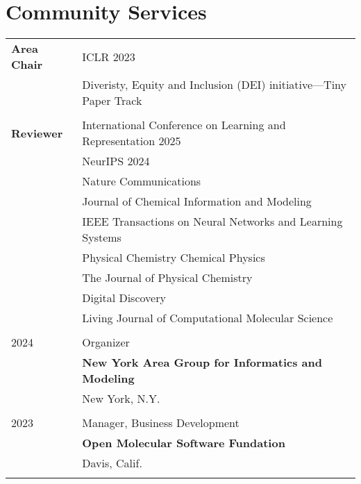\section{Community Services}
\begin{longtable}{p{} p{} }


\textbf{Area Chair} & ICLR 2023\\
& Diveristy, Equity and Inclusion (DEI) initiative---Tiny Paper Track \\\\

\textbf{Reviewer} & {International Conference on Learning and Representation 2025} \\
& {NeurIPS 2024} \\
& {Nature Communications} \\
& {Journal of Chemical Information and Modeling}\\
& {IEEE Transactions on Neural Networks and Learning Systems}\\
& {Physical Chemistry Chemical Physics} \\
& {The Journal of Physical Chemistry} \\
& {Digital Discovery} \\
& Living Journal of Computational Molecular Science \\\\

\textsc{2024} & Organizer \\
& \textbf{New York Area Group for Informatics and Modeling} \\
& New York, N.Y. \\\\


\textsc{2023} & Manager, Business Development \\
& \textbf{Open Molecular Software Fundation} \\
& Davis, Calif. \\\\




\end{longtable}


